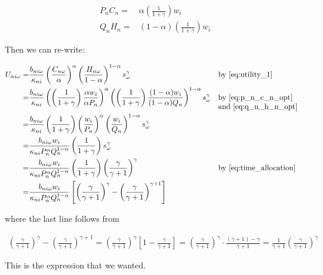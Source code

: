 \documentclass[10pt]{article}
\begin{document}
\begin{align}
    P_n C_n = &\alpha\left(\frac{1}{1+\gamma}\right) w_i \label{eq:p_n_c_n_opt} \\
    Q_n H_n = &(1-\alpha) \left(\frac{1}{1+\gamma}\right)w_i \label{eq:q_n_h_n_opt}
\end{align}

Then we can re-write:

\begin{align}
    U_{n i \omega}=&\frac{b_{n i \omega}}{\kappa_{n i}}\left(\frac{C_{n \omega}}{\alpha}\right)^\alpha\left(\frac{H_{n \omega}}{1-\alpha}\right)^{1-\alpha}s_\omega^\gamma && \parbox[t]{4cm}{\raggedright by \eqref{eq:utility_1}} \\
    = &\frac{b_{n i \omega}}{\kappa_{n i}}\left(\left(\frac{1}{1+\gamma}\right)\frac{\alpha w_i}{\alpha P_n}\right)^\alpha\left(\left(\frac{1}{1+\gamma}\right)\frac{(1-\alpha) w_i}{(1-\alpha) Q_n}\right)^{1-\alpha}s_\omega^\gamma && \parbox[t]{4cm}{\raggedright by \eqref{eq:p_n_c_n_opt} and \eqref{eq:q_n_h_n_opt}} \\
    = &\frac{b_{n i \omega}}{\kappa_{n i}}\left(\frac{1}{1+\gamma}\right)\left(\frac{w_i}{P_n}\right)^\alpha\left(\frac{w_i}{Q_n}\right)^{1-\alpha}s_\omega^\gamma \\
    = &\frac{b_{n i \omega} w_i}{\kappa_{n i} P_n^\alpha Q_n^{1-\alpha}} \left(\frac{1}{1+\gamma}\right) s_\omega^\gamma \\
    = &\frac{b_{n i \omega} w_i}{\kappa_{n i} P_n^\alpha Q_n^{1-\alpha}} \left(\frac{1}{1+\gamma}\right) \left(\frac{\gamma}{\gamma+1}\right)^{\gamma} && \parbox[t]{4cm}{\raggedright by \eqref{eq:time_allocation}} \\
    = & \frac{b_{n i \omega} w_i}{\kappa_{n i} P_n^\alpha Q_n^{1-\alpha}} \left[\left(\frac{\gamma}{\gamma+1}\right)^\gamma-\left(\frac{\gamma}{\gamma+1}\right)^{\gamma+1}\right]
\end{align}

where the last line follows from

\begin{align}
    \left(\frac{\gamma}{\gamma+1}\right)^\gamma-\left(\frac{\gamma}{\gamma+1}\right)^{\gamma+1}=\left(\frac{\gamma}{\gamma+1}\right)^\gamma\left[1-\frac{\gamma}{\gamma+1}\right]=\left(\frac{\gamma}{\gamma+1}\right)^\gamma \cdot \frac{(\gamma+1)-\gamma}{\gamma+1}=\frac{1}{\gamma+1}\left(\frac{\gamma}{\gamma+1}\right)^\gamma
\end{align}

This is the expression that we wanted.
\end{document}
